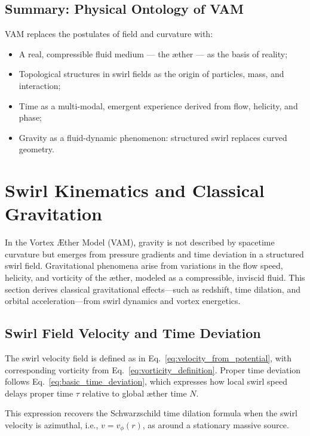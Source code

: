 \documentclass[12pt]{article}
\begin{document}
    \subsection{Summary: Physical Ontology of VAM}

    VAM replaces the postulates of field and curvature with:
    \begin{itemize}
        \item A real, compressible fluid medium — the æther — as the basis of reality;
        \item Topological structures in swirl fields as the origin of particles, mass, and interaction;
        \item Time as a multi-modal, emergent experience derived from flow, helicity, and phase;
        \item Gravity as a fluid-dynamic phenomenon: structured swirl replaces curved geometry.
    \end{itemize}

\section{Swirl Kinematics and Classical Gravitation}

    In the Vortex \AE ther Model (VAM), gravity is not described by spacetime curvature but emerges from pressure gradients and time deviation in a structured swirl field. Gravitational phenomena arise from variations in the flow speed, helicity, and vorticity of the æther, modeled as a compressible, inviscid fluid. This section derives classical gravitational effects—such as redshift, time dilation, and orbital acceleration—from swirl dynamics and vortex energetics.

    \subsection{Swirl Field Velocity and Time Deviation}

    The swirl velocity field is defined as in Eq.~\ref{eq:velocity_from_potential}, with corresponding vorticity from Eq.~\ref{eq:vorticity_definition}. Proper time deviation follows Eq.~\ref{eq:basic_time_deviation}, which expresses how local swirl speed delays proper time $\tau$ relative to global æther time $N$.

    This expression recovers the Schwarzschild time dilation formula when the swirl velocity is azimuthal, i.e., $v = v_\phi(r)$, as around a stationary massive source.
\end{document}
